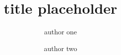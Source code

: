 \documentclass[a4paper]{llncs}
\begin{document}
\mainmatter  %

\title{title placeholder}

%
%
\author{author one \and author two}



\maketitle

\begin{abstract}
\blindtext 

\end{abstract}





\nocite{*}

%
\end{document}
